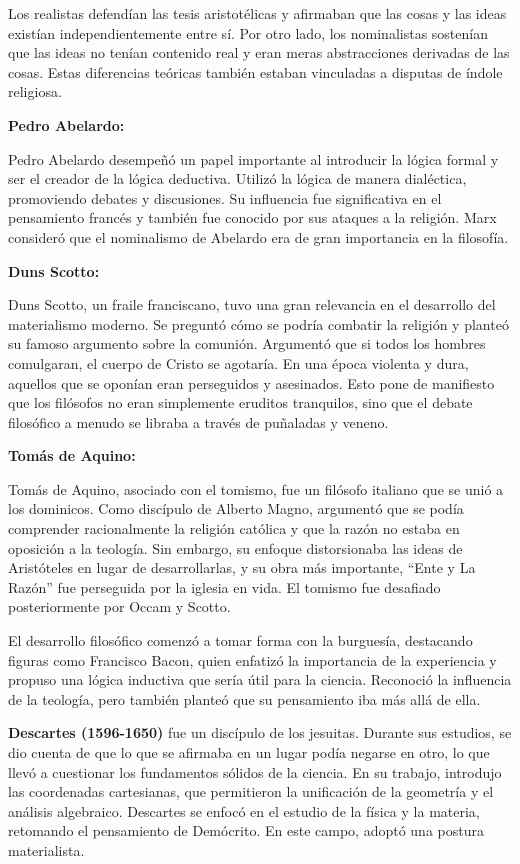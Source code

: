 \documentclass[
  letterpaper,
  DIV=11,
  numbers=noendperiod]{scrartcl}
\begin{document}
Los realistas defendían las tesis aristotélicas y afirmaban que las
cosas y las ideas existían independientemente entre sí. Por otro lado,
los nominalistas sostenían que las ideas no tenían contenido real y eran
meras abstracciones derivadas de las cosas. Estas diferencias teóricas
también estaban vinculadas a disputas de índole religiosa.

\textbf{Pedro Abelardo:}

Pedro Abelardo desempeñó un papel importante al introducir la lógica
formal y ser el creador de la lógica deductiva. Utilizó la lógica de
manera dialéctica, promoviendo debates y discusiones. Su influencia fue
significativa en el pensamiento francés y también fue conocido por sus
ataques a la religión. Marx consideró que el nominalismo de Abelardo era
de gran importancia en la filosofía.

\textbf{Duns Scotto:}

Duns Scotto, un fraile franciscano, tuvo una gran relevancia en el
desarrollo del materialismo moderno. Se preguntó cómo se podría combatir
la religión y planteó su famoso argumento sobre la comunión. Argumentó
que si todos los hombres comulgaran, el cuerpo de Cristo se agotaría. En
una época violenta y dura, aquellos que se oponían eran perseguidos y
asesinados. Esto pone de manifiesto que los filósofos no eran
simplemente eruditos tranquilos, sino que el debate filosófico a menudo
se libraba a través de puñaladas y veneno.

\textbf{Tomás de Aquino:}

Tomás de Aquino, asociado con el tomismo, fue un filósofo italiano que
se unió a los dominicos. Como discípulo de Alberto Magno, argumentó que
se podía comprender racionalmente la religión católica y que la razón no
estaba en oposición a la teología. Sin embargo, su enfoque distorsionaba
las ideas de Aristóteles en lugar de desarrollarlas, y su obra más
importante, ``Ente y La Razón'' fue perseguida por la iglesia en vida.
El tomismo fue desafiado posteriormente por Occam y Scotto.

El desarrollo filosófico comenzó a tomar forma con la burguesía,
destacando figuras como Francisco Bacon, quien enfatizó la importancia
de la experiencia y propuso una lógica inductiva que sería útil para la
ciencia. Reconoció la influencia de la teología, pero también planteó
que su pensamiento iba más allá de ella.

\textbf{Descartes (1596-1650)} fue un discípulo de los jesuitas. Durante
sus estudios, se dio cuenta de que lo que se afirmaba en un lugar podía
negarse en otro, lo que llevó a cuestionar los fundamentos sólidos de la
ciencia. En su trabajo, introdujo las coordenadas cartesianas, que
permitieron la unificación de la geometría y el análisis algebraico.
Descartes se enfocó en el estudio de la física y la materia, retomando
el pensamiento de Demócrito. En este campo, adoptó una postura
materialista.
\end{document}
